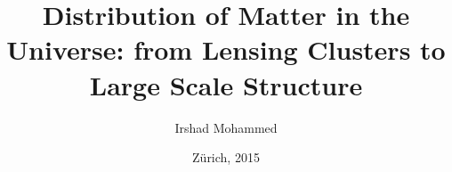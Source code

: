 


\title{Distribution of Matter in the Universe: from Lensing Clusters
to  Large Scale Structure}

\author{Irshad Mohammed}






\date{Z\"urich, 2015}

